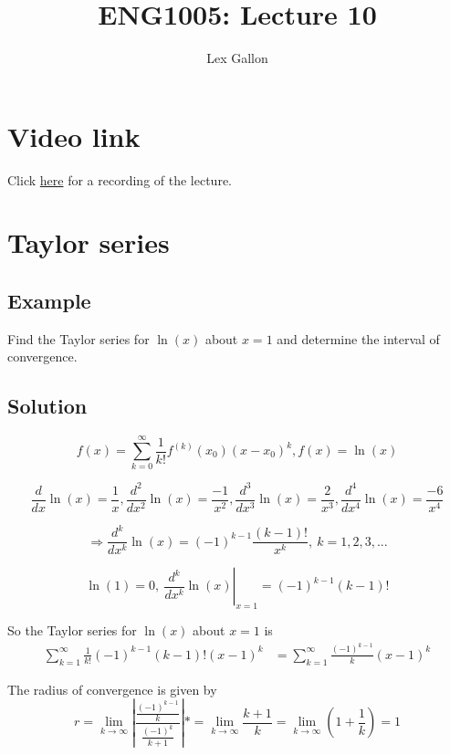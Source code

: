 \documentclass[11pt]{article}
\begin{document}
\title{ENG1005: Lecture 10}
\author{Lex Gallon}
\maketitle

\tableofcontents

\section*{Video link}
Click \href{https://echo360.org.au/lesson/G_8402119b-734b-4e1e-a3b4-7e907e86ddba_b944cecf-8ba5-40d3-a870-0243a0a9e78c_2020-04-07T15:58:00.000_2020-04-07T16:53:00.000/classroom#sortDirection=desc}{here} for a recording of the lecture.

\section{Taylor series}
\subsection{Example}
Find the Taylor series for $\ln(x)$ about $x=1$ and determine the interval of convergence.

\subsection{Solution}
\[ f(x) = \sum_{k=0}^\infty \frac{1}{k!} f^{(k)}(x_0)(x-x_0)^k , f(x) = \ln(x) \]

\[ \frac{d}{dx}\ln(x) = \frac{1}{x},  \frac{d^2}{dx^2}\ln(x) = \frac{-1}{x^2}, \frac{d^3}{dx^3}\ln(x) = \frac{2}{x^3}, \frac{d^4}{dx^4}\ln(x) = \frac{-6}{x^4} \]

\[ \Rightarrow \frac{d^k}{dx^k}\ln(x) =(-1)^{k-1} \frac{(k-1)!}{x^k} ,\ k=1,2,3,... \]

\[ \ln(1) = 0,\ \left. \frac{d^k}{dx^k}\ln(x) \right|_{x=1} = (-1)^{k-1} (k-1)! \]

So the Taylor series for $\ln(x)$ about $x=1$ is
\begin{align*}
\sum_{k=1}^\infty \frac{1}{k!} (-1)^{k-1} (k-1)!(x-1)^k &= \sum_{k=1}^\infty \frac{(-1)^{k-1}}{k} (x-1)^k
\end{align*}

The radius of convergence is given by
\[
r = \lim_{k\rightarrow\infty} \left| \frac{\frac{(-1)^{k-1}}{k}}{\frac{(-1)^k}{k+1}} \right| *= \lim_{k\rightarrow\infty} \frac{k+1}{k} = \lim_{k\rightarrow\infty} \left( 1 + \frac{1}{k} \right) = 1
\]
\end{document}
